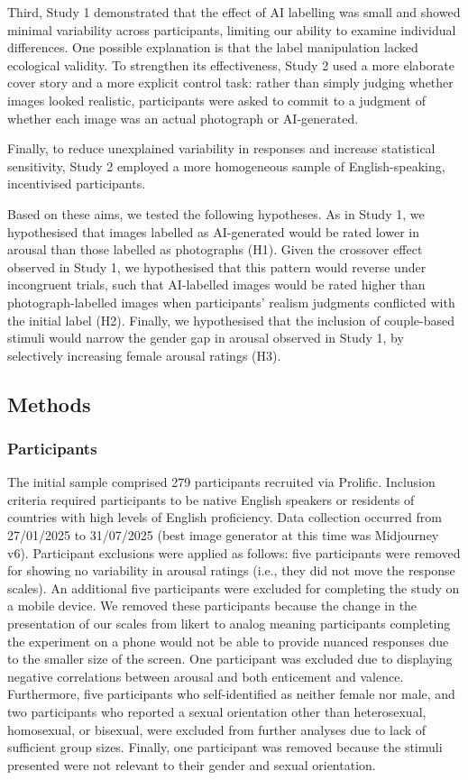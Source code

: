 \documentclass[
  jou,
  floatsintext,
  longtable,
  nolmodern,
  notxfonts,
  notimes,
  colorlinks=true,linkcolor=blue,citecolor=blue,urlcolor=blue]{apa7}
\begin{document}
Third, Study 1 demonstrated that the effect of AI labelling was small
and showed minimal variability across participants, limiting our ability
to examine individual differences. One possible explanation is that the
label manipulation lacked ecological validity. To strengthen its
effectiveness, Study 2 used a more elaborate cover story and a more
explicit control task: rather than simply judging whether images looked
realistic, participants were asked to commit to a judgment of whether
each image was an actual photograph or AI-generated.

Finally, to reduce unexplained variability in responses and increase
statistical sensitivity, Study 2 employed a more homogeneous sample of
English-speaking, incentivised participants.

Based on these aims, we tested the following hypotheses. As in Study 1,
we hypothesised that images labelled as AI-generated would be rated
lower in arousal than those labelled as photographs (H1). Given the
crossover effect observed in Study 1, we hypothesised that this pattern
would reverse under incongruent trials, such that AI-labelled images
would be rated higher than photograph-labelled images when participants'
realism judgments conflicted with the initial label (H2). Finally, we
hypothesised that the inclusion of couple-based stimuli would narrow the
gender gap in arousal observed in Study 1, by selectively increasing
female arousal ratings (H3).

\subsection{Methods}\label{methods-1}

\subsubsection{Participants}\label{participants}

The initial sample comprised 279 participants recruited via
Prolific\textcopyright. Inclusion criteria required participants to be
native English speakers or residents of countries with high levels of
English proficiency. Data collection occurred from 27/01/2025 to
31/07/2025 (best image generator at this time was Midjourney v6).
Participant exclusions were applied as follows: five participants were
removed for showing no variability in arousal ratings (i.e., they did
not move the response scales). An additional five participants were
excluded for completing the study on a mobile device. We removed these
participants because the change in the presentation of our scales from
likert to analog meaning participants completing the experiment on a
phone would not be able to provide nuanced responses due to the smaller
size of the screen. One participant was excluded due to displaying
negative correlations between arousal and both enticement and valence.
Furthermore, five participants who self-identified as neither female nor
male, and two participants who reported a sexual orientation other than
heterosexual, homosexual, or bisexual, were excluded from further
analyses due to lack of sufficient group sizes. Finally, one participant
was removed because the stimuli presented were not relevant to their
gender and sexual orientation.
\end{document}
